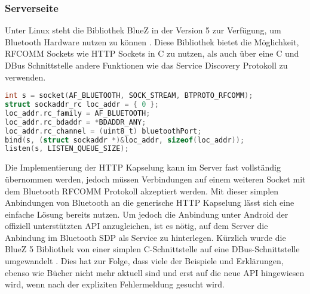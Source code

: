         \subsubsection{Serverseite}        
        Unter Linux steht die Bibliothek BlueZ in der Version 5 zur Verfügung, um Bluetooth Hardware nutzen zu können \cite{bluezMigration}. Diese Bibliothek bietet die Möglichkeit, RFCOMM Sockets wie HTTP Sockets in C zu nutzen, als auch über eine C und DBus Schnittstelle andere Funktionen wie das Service Discovery Protokoll zu verwenden.
        
        \begin{lstlisting}[frame=bt, label={lst:bluetooth:socket}, language=C, caption=Verbindungsaufbau mit Bluetooth (Servercode in C)]
int s = socket(AF_BLUETOOTH, SOCK_STREAM, BTPROTO_RFCOMM);
struct sockaddr_rc loc_addr = { 0 };
loc_addr.rc_family = AF_BLUETOOTH;
loc_addr.rc_bdaddr = *BDADDR_ANY;
loc_addr.rc_channel = (uint8_t) bluetoothPort;
bind(s, (struct sockaddr *)&loc_addr, sizeof(loc_addr));
listen(s, LISTEN_QUEUE_SIZE);
        \end{lstlisting}
        Die Implementierung der HTTP Kapselung kann im Server fast vollständig übernommen werden, jedoch müssen Verbindungen auf einem weiteren Socket mit dem Bluetooth RFCOMM Protokoll akzeptiert werden. Mit dieser simplen Anbindungen von Bluetooth an die generische HTTP Kapselung lässt sich eine einfache Lösung bereits nutzen. Um jedoch die Anbindung unter Android der offiziell unterstützten API anzugleichen, ist es nötig, auf dem Server die Anbindung im Bluetooth SDP als Service zu hinterlegen. Kürzlich wurde die BlueZ 5 Bibliothek von einer simplen C-Schnittstelle auf eine DBus-Schnittstelle umgewandelt \cite{BluezMigration}. Dies hat zur Folge, dass viele der Beispiele und Erklärungen, ebenso wie Bücher nicht mehr aktuell sind und erst auf die neue API hingewiesen wird, wenn nach der expliziten Fehlermeldung gesucht wird.
        
